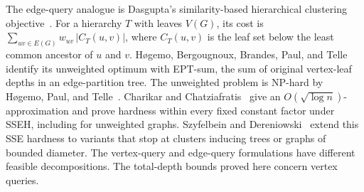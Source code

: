 The edge-query analogue is Dasgupta's similarity-based hierarchical
clustering objective~\cite{Dasgupta2016}. For a hierarchy $T$ with
leaves $V(G)$, its cost is
$\sum_{uv\in E(G)}w_{uv}\,|C_T(u,v)|$,
where $C_T(u,v)$ is the leaf set below the least common ancestor
of $u$ and $v$. H\o gemo, Bergougnoux, Brandes, Paul, and Telle~\cite[Theorem~6]{HogemoEtAl2021}
identify its unweighted optimum with EPT-sum, the sum of original
vertex-leaf depths in an edge-partition tree. The unweighted problem
is \textup{NP}-hard by H\o gemo, Paul, and
Telle~\cite{HogemoPaulTelle2020}. Charikar and
Chatziafratis~\cite{CharikarChatziafratis2017} give an
$O(\sqrt{\log n})$-approximation and prove hardness within every
fixed constant factor under \textup{SSEH}, including for unweighted graphs.
Szyfelbein and Dereniowski~\cite{SzyfelbeinDereniowski2026}
extend this \textup{SSE} hardness to variants that stop at clusters inducing
trees or graphs of bounded diameter.
The vertex-query and edge-query formulations have different feasible
decompositions. The total-depth bounds proved here concern vertex
queries.

